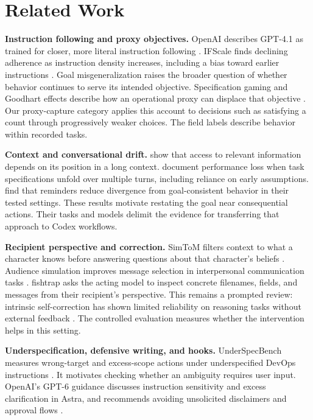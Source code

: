 \section{Related Work}
\label{sec:related}

\textbf{Instruction following and proxy objectives.}
OpenAI describes GPT-4.1 as trained for closer, more literal instruction following \citep{openai2025gpt41}. IFScale finds declining adherence as instruction density increases, including a bias toward earlier instructions \citep{jaroslawicz2025instructions}. Goal misgeneralization raises the broader question of whether behavior continues to serve its intended objective. Specification gaming and Goodhart effects describe how an operational proxy can displace that objective \citep{amodei2016concrete,manheim2018categorizing}. Our proxy-capture category applies this account to decisions such as satisfying a count through progressively weaker choices. The field labels describe behavior within recorded tasks.

\textbf{Context and conversational drift.}
\citet{liu2023lost} show that access to relevant information depends on its position in a long context. \citet{laban2025lost} document performance loss when task specifications unfold over multiple turns, including reliance on early assumptions. \citet{dongre2025drift} find that reminders reduce divergence from goal-consistent behavior in their tested settings. These results motivate restating the goal near consequential actions. Their tasks and models delimit the evidence for transferring that approach to Codex workflows.

\textbf{Recipient perspective and correction.}
SimToM filters context to what a character knows before answering questions about that character's beliefs \citep{wilf2023think}. Audience simulation improves message selection in interpersonal communication tasks \citep{liu2023audiences}. fishtrap asks the acting model to inspect concrete filenames, fields, and messages from their recipient's perspective. This remains a prompted review: intrinsic self-correction has shown limited reliability on reasoning tasks without external feedback \citep{huang2023selfcorrect}. The controlled evaluation measures whether the intervention helps in this setting.

\textbf{Underspecification, defensive writing, and hooks.}
UnderSpecBench measures wrong-target and excess-scope actions under underspecified DevOps instructions \citep{ji2026guessing}. It motivates checking whether an ambiguity requires user input. OpenAI's GPT-6 guidance discusses instruction sensitivity and excess clarification in Astra, and recommends avoiding unsolicited disclaimers and approval flows \citep{openai2026gpt6}.

